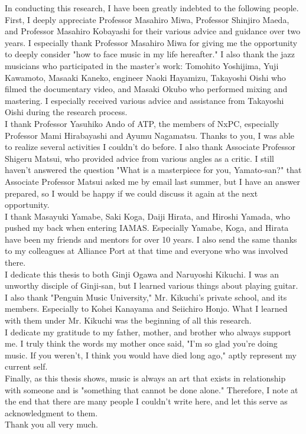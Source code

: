 In conducting this research, I have been greatly indebted to the following people. First, I deeply appreciate Professor Masahiro Miwa, Professor Shinjiro Maeda, and Professor Masahiro Kobayashi for their various advice and guidance over two years. I especially thank Professor Masahiro Miwa for giving me the opportunity to deeply consider "how to face music in my life hereafter." I also thank the jazz musicians who participated in the master's work: Tomohito Yoshijima, Yuji Kawamoto, Masaaki Kaneko, engineer Naoki Hayamizu, Takayoshi Oishi who filmed the documentary video, and Masaki Okubo who performed mixing and mastering. I especially received various advice and assistance from Takayoshi Oishi during the research process.\\

I thank Professor Yasuhiko Ando of ATP, the members of NxPC, especially Professor Mami Hirabayashi and Ayumu Nagamatsu. Thanks to you, I was able to realize several activities I couldn't do before. I also thank Associate Professor Shigeru Matsui, who provided advice from various angles as a critic. I still haven't answered the question "What is a masterpiece for you, Yamato-san?" that Associate Professor Matsui asked me by email last summer, but I have an answer prepared, so I would be happy if we could discuss it again at the next opportunity.\\

I thank Masayuki Yamabe, Saki Koga, Daiji Hirata, and Hiroshi Yamada, who pushed my back when entering IAMAS. Especially Yamabe, Koga, and Hirata have been my friends and mentors for over 10 years. I also send the same thanks to my colleagues at Alliance Port at that time and everyone who was involved there.\\

I dedicate this thesis to both Ginji Ogawa and Naruyoshi Kikuchi. I was an unworthy disciple of Ginji-san, but I learned various things about playing guitar. I also thank "Penguin Music University," Mr. Kikuchi's private school, and its members. Especially to Kohei Kanayama and Seiichiro Honjo. What I learned with them under Mr. Kikuchi was the beginning of all this research.\\

I dedicate my gratitude to my father, mother, and brother who always support me. I truly think the words my mother once said, "I'm so glad you're doing music. If you weren't, I think you would have died long ago," aptly represent my current self.\\

Finally, as this thesis shows, music is always an art that exists in relationship with someone and is "something that cannot be done alone." Therefore, I note at the end that there are many people I couldn't write here, and let this serve as acknowledgment to them.\\

Thank you all very much.


